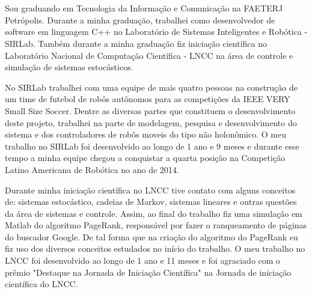 \documentclass[a4paper]{report} %
\begin{document}
\section*{}
\vspace{-1.3cm}
\subsection*{}

\vspace{1cm}

Sou graduando em Tecnologia da Informação e Comunicação na FAETERJ Petrópolis. Durante a minha graduação, trabalhei como desenvolvedor de software em linguagem C++ no Laboratório de Sistemas Inteligentes e Robótica - SIRLab. Também durante a minha graduação fiz iniciação científica no Laboratório Nacional de Computação Científica - LNCC na área de controle e simulação de sistemas estocásticos. 

No SIRLab trabalhei com uma equipe de mais quatro pessoas na construção de um time de futebol de robôs autônomos para as competições da IEEE VERY Small Size Soccer. Dentre as diversas partes que constituem o desenvolvimento deste projeto, trabalhei na parte de modelagem, pesquisa e desenvolvimento do sistema e dos controladores de robôs moveis do tipo não holonômico. O meu trabalho no SIRLab foi desenvolvido ao longo de 1 ano e 9 meses e durante esse tempo a minha equipe chegou a conquistar a quarta posição na Competição Latino Americana de Robótica no ano de 2014.

Durante minha iniciação científica no LNCC tive contato com alguns conceitos de: sistemas estocástico, cadeias de Markov, sistemas lineares e outras questões da área de sistemas e controle. Assim, ao final do trabalho fiz uma simulação em Matlab do algoritmo PageRank, responsável por fazer o ranqueamento de páginas do buscador Google. De tal forma que na criação do algoritmo do PageRank eu fiz uso dos diversos conceitos estudados no início do trabalho. O meu trabalho no LNCC foi desenvolvido ao longo de 1 ano e 11 meses e foi agraciado com o prêmio "Destaque na Jornada de Iniciação Científica" na Jornada de iniciação científica do LNCC.

\end{document}
